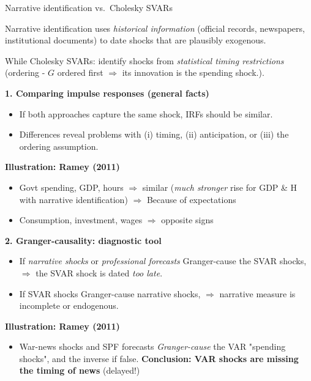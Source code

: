 \documentclass{beamer}
\begin{document}
\begin{frame}{Narrative identification vs.\ Cholesky SVARs}
\scriptsize

Narrative identification uses \emph{historical information} (official records, newspapers, institutional documents) to date shocks that are plausibly exogenous.  


While Cholesky SVARs: identify shocks from \emph{statistical timing restrictions} (ordering -  $G$ ordered first $\Rightarrow$ its innovation is the spending shock.).

\vspace{0.3cm}

\textbf{1. Comparing impulse responses (general facts)}
\begin{itemize}
  \item If both approaches capture the same shock, IRFs should be similar.
  \item Differences reveal problems with (i) timing, (ii) anticipation, or (iii) the ordering assumption.
\end{itemize}

\textbf{Illustration: Ramey (2011)}
\begin{itemize}
  \item Govt spending, GDP, hours $\Longrightarrow$ similar (\textit{much stronger} rise for GDP \& H with narrative identification) $\Longrightarrow$ Because of expectations
  \item Consumption, investment, wages $\Longrightarrow$ opposite signs
\end{itemize}

\vspace{0.2cm}

\textbf{2. Granger-causality: diagnostic tool}
\begin{itemize}
  \item If \emph{narrative shocks} or \emph{professional forecasts} Granger-cause the SVAR shocks,  
        $\Rightarrow$ the SVAR shock is dated \emph{too late}.
  \item If SVAR shocks Granger-cause narrative shocks, $\Rightarrow$ narrative measure is incomplete or endogenous.
\end{itemize}

\textbf{Illustration: Ramey (2011)}
\begin{itemize}
  \item War-news shocks and SPF forecasts \emph{Granger-cause} the VAR "spending shocks", and the inverse if false. \textbf{Conclusion: VAR shocks are missing the timing of news} (delayed!)
\end{itemize}

\end{frame}
\end{document}
